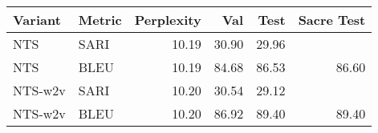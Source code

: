 \begin{tabular}{llrrrr}
\toprule
 Variant & Metric & Perplexity &   Val &  Test & Sacre Test \\
\midrule
     NTS &   SARI &      10.19 & 30.90 & 29.96 &            \\
     NTS &   BLEU &      10.19 & 84.68 & 86.53 &      86.60 \\
 NTS-w2v &   SARI &      10.20 & 30.54 & 29.12 &            \\
 NTS-w2v &   BLEU &      10.20 & 86.92 & 89.40 &      89.40 \\
\bottomrule
\end{tabular}
